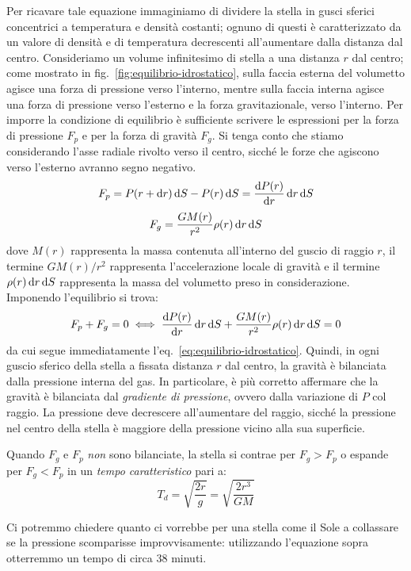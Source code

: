 Per ricavare tale equazione immaginiamo di dividere la stella in gusci sferici concentrici a temperatura e densità costanti; ognuno di questi è caratterizzato da un valore di densità e di temperatura decrescenti all'aumentare dalla distanza dal centro. Consideriamo un volume infinitesimo di stella a una distanza $r$ dal centro; come mostrato in fig.~\ref{fig:equilibrio-idrostatico}, sulla faccia esterna del volumetto agisce una forza di pressione verso l'interno, mentre sulla faccia interna agisce una forza di pressione verso l'esterno e la forza gravitazionale, verso l'interno. Per imporre la condizione di equilibrio è sufficiente scrivere le espressioni per la forza di pressione $F_p$ e per la forza di gravità $F_g$. Si tenga conto che stiamo considerando l'asse radiale rivolto verso il centro, sicché le forze che agiscono verso l'esterno avranno segno negativo.
\[
    F_p = P(r+\mathop{\mathrm{{}d}}\mathopen{} r) \mathop{\mathrm{{}d}}\mathopen{} S - P(r) \mathop{\mathrm{{}d}}\mathopen{} S = \frac{\mathop{\mathrm{{}d}}\mathopen{} P(r)}{\mathop{\mathrm{{}d}}\mathopen{} r} \mathop{\mathrm{{}d}}\mathopen{} r \mathop{\mathrm{{}d}}\mathopen{} S
\]
\[
    F_g = \frac{GM(r)}{r^2} \rho(r) \mathop{\mathrm{{}d}}\mathopen{} r \mathop{\mathrm{{}d}}\mathopen{} S
\]
dove $M(r)$ rappresenta la massa contenuta all'interno del guscio di raggio $r$, il termine $GM(r) / r^2$ rappresenta l'accelerazione locale di gravità e il termine $\rho(r) \mathop{\mathrm{{}d}}\mathopen{} r \mathop{\mathrm{{}d}}\mathopen{} S$ rappresenta la massa del volumetto preso in considerazione. Imponendo l'equilibrio si trova:
\[
    F_p + F_g = 0 \iff \frac{\mathop{\mathrm{{}d}}\mathopen{} P(r)}{\mathop{\mathrm{{}d}}\mathopen{} r} \mathop{\mathrm{{}d}}\mathopen{} r \mathop{\mathrm{{}d}}\mathopen{} S+ \frac{GM(r)}{r^2} \rho(r) \mathop{\mathrm{{}d}}\mathopen{} r \mathop{\mathrm{{}d}}\mathopen{} S = 0
\]
da cui segue immediatamente l'eq.~\eqref{eq:equilibrio-idrostatico}. Quindi, in ogni guscio sferico della stella a fissata distanza $r$ dal centro, la gravità è bilanciata dalla pressione interna del gas. In particolare, è più corretto affermare che la gravità è bilanciata dal \emph{gradiente di pressione}, ovvero dalla variazione di $P$ col raggio. La pressione deve decrescere all'aumentare del raggio, sicché la pressione nel centro della stella è maggiore della pressione vicino alla sua superficie. 

Quando $F_g$ e $F_p$ \emph{non} sono bilanciate, la stella si contrae per $F_g > F_p$ o espande per $F_g < F_p$ in un \emph{tempo caratteristico} pari a:
\[
    T_d = \sqrt{\frac{2r}{g}} = \sqrt{\frac{2r^3}{GM}}
\]

Ci potremmo chiedere quanto ci vorrebbe per una stella come il Sole a collassare se la pressione scomparisse improvvisamente: utilizzando l'equazione sopra otterremmo un tempo di circa 38 minuti.